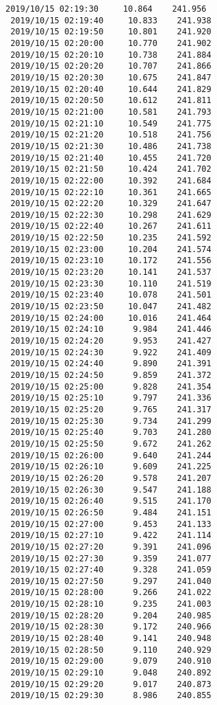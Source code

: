 \documentclass[11pt]{article}
\begin{document}
\begin{Verbatim}[commandchars=\\\{\}]
 2019/10/15 02:19:30     10.864    241.956
 2019/10/15 02:19:40     10.833    241.938
 2019/10/15 02:19:50     10.801    241.920
 2019/10/15 02:20:00     10.770    241.902
 2019/10/15 02:20:10     10.738    241.884
 2019/10/15 02:20:20     10.707    241.866
 2019/10/15 02:20:30     10.675    241.847
 2019/10/15 02:20:40     10.644    241.829
 2019/10/15 02:20:50     10.612    241.811
 2019/10/15 02:21:00     10.581    241.793
 2019/10/15 02:21:10     10.549    241.775
 2019/10/15 02:21:20     10.518    241.756
 2019/10/15 02:21:30     10.486    241.738
 2019/10/15 02:21:40     10.455    241.720
 2019/10/15 02:21:50     10.424    241.702
 2019/10/15 02:22:00     10.392    241.684
 2019/10/15 02:22:10     10.361    241.665
 2019/10/15 02:22:20     10.329    241.647
 2019/10/15 02:22:30     10.298    241.629
 2019/10/15 02:22:40     10.267    241.611
 2019/10/15 02:22:50     10.235    241.592
 2019/10/15 02:23:00     10.204    241.574
 2019/10/15 02:23:10     10.172    241.556
 2019/10/15 02:23:20     10.141    241.537
 2019/10/15 02:23:30     10.110    241.519
 2019/10/15 02:23:40     10.078    241.501
 2019/10/15 02:23:50     10.047    241.482
 2019/10/15 02:24:00     10.016    241.464
 2019/10/15 02:24:10      9.984    241.446
 2019/10/15 02:24:20      9.953    241.427
 2019/10/15 02:24:30      9.922    241.409
 2019/10/15 02:24:40      9.890    241.391
 2019/10/15 02:24:50      9.859    241.372
 2019/10/15 02:25:00      9.828    241.354
 2019/10/15 02:25:10      9.797    241.336
 2019/10/15 02:25:20      9.765    241.317
 2019/10/15 02:25:30      9.734    241.299
 2019/10/15 02:25:40      9.703    241.280
 2019/10/15 02:25:50      9.672    241.262
 2019/10/15 02:26:00      9.640    241.244
 2019/10/15 02:26:10      9.609    241.225
 2019/10/15 02:26:20      9.578    241.207
 2019/10/15 02:26:30      9.547    241.188
 2019/10/15 02:26:40      9.515    241.170
 2019/10/15 02:26:50      9.484    241.151
 2019/10/15 02:27:00      9.453    241.133
 2019/10/15 02:27:10      9.422    241.114
 2019/10/15 02:27:20      9.391    241.096
 2019/10/15 02:27:30      9.359    241.077
 2019/10/15 02:27:40      9.328    241.059
 2019/10/15 02:27:50      9.297    241.040
 2019/10/15 02:28:00      9.266    241.022
 2019/10/15 02:28:10      9.235    241.003
 2019/10/15 02:28:20      9.204    240.985
 2019/10/15 02:28:30      9.172    240.966
 2019/10/15 02:28:40      9.141    240.948
 2019/10/15 02:28:50      9.110    240.929
 2019/10/15 02:29:00      9.079    240.910
 2019/10/15 02:29:10      9.048    240.892
 2019/10/15 02:29:20      9.017    240.873
 2019/10/15 02:29:30      8.986    240.855

\end{Verbatim}
\end{document}
